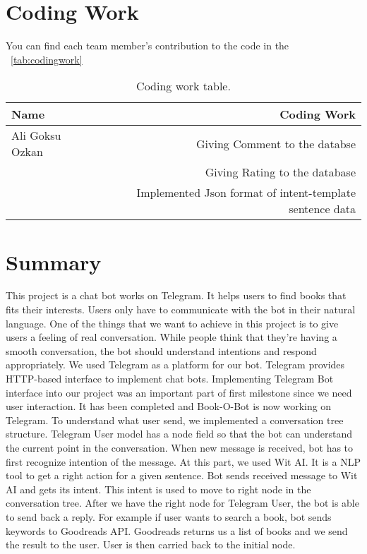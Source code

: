 \documentclass[a4paper]{article}
\begin{document}
\section{Coding Work}
You can find each team member's contribution to the code in the ~\autoref{tab:codingwork}

\begin{table}[!hb]
\centering
\begin{tabular}{l|r}
Name & Coding Work \\\hline
Ali Goksu Ozkan & Giving Comment to the databse \\
& Giving Rating to the database \\
& Implemented Json format of intent-template sentence data
\end{tabular}
\caption{\label{tab:codingwork}Coding work table.}
\end{table}

\section{Summary}
This project is a chat bot works on Telegram. It helps users to find books that fits their interests.
Users only have to communicate with the bot in their natural language. One of the things that we
want to achieve in this project is to give users a feeling of real conversation. While people think
that they’re having a smooth conversation, the bot should understand intentions and respond
appropriately.
We used Telegram as a platform for our bot. Telegram provides HTTP-based interface to
implement chat bots. Implementing Telegram Bot interface into our project was an important
part of first milestone since we need user interaction. It has been completed and Book-O-Bot is
now working on Telegram.
To understand what user send, we implemented a conversation tree structure. Telegram User
model has a node field so that the bot can understand the current point in the conversation. When
new message is received, bot has to first recognize intention of the message. At this part, we used
Wit AI. It is a NLP tool to get a right action for a given sentence. Bot sends received message to
Wit AI and gets its intent. This intent is used to move to right node in the conversation tree.
After we have the right node for Telegram User, the bot is able to send back a reply. For
example if user wants to search a book, bot sends keywords to Goodreads API.
Goodreads returns us a list of books and we send the result to the user. User is then carried
back to the initial node.
\end{document}
